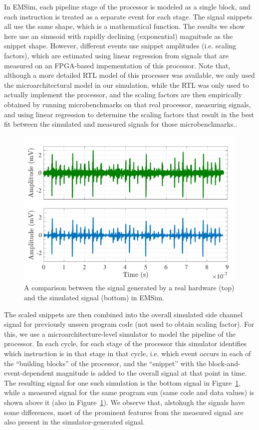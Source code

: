 In EMSim, each pipeline stage of the processor is modeled as a single block, and each instruction is treated as a separate event for each stage. The signal snippets all use the same shape, which is a mathematical function. The results we show here use an sinusoid with rapidly declining (exponential) magnitude as the snippet shape. However, different events use snippet amplitudes (i.e. scaling factors), which are estimated using linear regression from signals that are measured on an FPGA-based impementation of this processor. Note that, although a more detailed RTL model of this processer was available,
we only used the microarchitectural model in our simulation, while the RTL was only used to actually implement the processor, and the scaling factors are then empirically obtained by running microbenchmarks on that real processor, measuring signals, and using linear regression to determine the  scaling factors that result in the best fit between the simulated and measured signals for those microbenchmarks..

\begin{figure}
	\centering
	\includegraphics[width=0.4\columnwidth,clip]{figure/bench.pdf}
	\caption{A comparison between the signal generated by a real hardware (top) and the simulated signal (bottom) in EMSim.}
	\label{fig:bench}
\end{figure}
The scaled snippets are then combined into the overall simulated side channel signal for previously unseen program code (not used to obtain scaling factor). For this, we use a microarchitecture-level simulator to model the pipeline of the processor. In each cycle,
for each stage of the processor this simulator identifies which instruction is in that stage in that cycle, i.e. which event occurs in each of the ``building blocks'' of the processor, and
the ``snippet'' with the block-and-event-dependent magnitude is added to the overall signal at that point in time. The resulting signal for one such simulation is the bottom signal in Figure~\ref{fig:bench}, while a measured signal for the same program sun (same code and data values) is shown above it (also in Figure~\ref{fig:bench}). We observe that, alstohugh the signals have some differences, most of the prominent features from the measured signal are also present in the simulator-generated signal.

